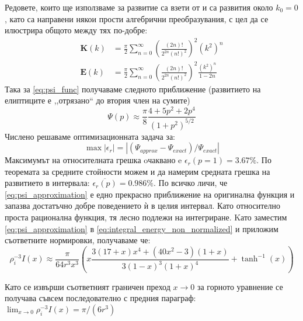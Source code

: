 Редовете, които ще използваме за развитие са взети от \cite{gradshteyn} и са развития около $k_0 = 0$ , като са направени някои прости алгебрични преобразувания, с цел да се илюстрира общото между тях по-добре:
\begin{align*}
	\boldsymbol{K}(k) & =\frac{\pi}{2}   \sum _{n=0}^{\infty } \left(\frac{(2 n)!}{2^{2 n} (n!)^2}\right)^2 \left(k^2\right)^n               \\
	\boldsymbol{E}(k) & =\frac{\pi}{2}   \sum _{n=0}^{\infty } \left(\frac{(2 n)!}{2^{2 n} (n!)^2}\right)^2 \frac{\left(k^2\right)^n}{1-2 n}
\end{align*}
Така за \autoref{eq:psi_func} получаваме следното приближение (развитието на елиптиците е ,,отрязано`` до втория член на сумите)
\begin{equation}
	\Psi(p) \approx \frac{\pi}{8} \frac{4+5p^2+2p^4}{(1+p^2)^{5/2}}
	\label{eq:psi_approximation}
\end{equation}
Числено решаваме оптимизационната задача за:
\begin{equation*}
	\max |\epsilon_r| = |(\Psi_{approx}-\Psi_{exact})/\Psi_{exact}|
\end{equation*}
Максимумът на относителната грешка oчаквано e $\epsilon_r(p = 1) = 3.67\%$. По теоремата за средните стойности можем и да намерим
средната грешка на развитието в интервала: $\overline{\epsilon_r(p)} = 0.986\%$. По всичко личи, че \autoref{eq:psi_approximation} е едно прекрасно приближение на оригинална функция и запазва достатъчно добре поведението ѝ в целия интервал.
Като относително проста рационална функция, тя лесно подлежи на интегриране. Kато заместим \autoref{eq:psi_approximation} в \autoref{eq:integral_energy_non_normalized} и приложим съответните нормировки, получаваме че:
\begin{equation}
	\label{eq:arctan_approx}
	\rho_{i}^{-3} I(x) \approx \frac{\pi }{64 r^3 x^3} \left( x \frac{3 (17+x) x^4+\left(40 x^2-3\right) (1+x)}{3 (1-x)^3 (1+x)^4} +\tanh ^{-1}(x) \right)
\end{equation}

Като се извърши съответният граничен преход $ x \rightarrow 0 $ за горното уравнение се получава съвсем последователно с предния параграф:  $\lim_{x\to 0} \rho_{i}^{-3} I(x) = \pi/(6 r^3)$